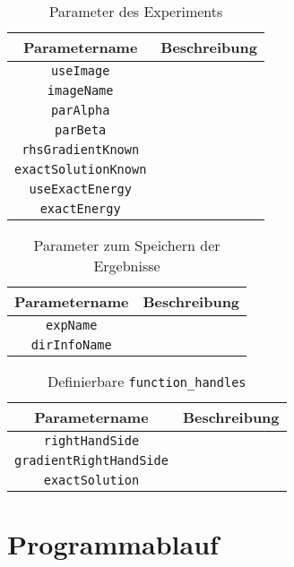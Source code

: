 \begin{table}
  \centering
  \begin{tabular}{c|p{9cm}}
    \hline
    Parametername  & Beschreibung\\  
    \hline
    \texttt{useImage} & \\
    \texttt{imageName} & \\
    \texttt{parAlpha}& \\
    \texttt{parBeta} & \\
    \texttt{rhsGradientKnown} & \\
    \texttt{exactSolutionKnown}& \\
    \texttt{useExactEnergy} & \\
    \texttt{exactEnergy} & \\
    \hline
  \end{tabular}
  \caption{Parameter des Experiments}
  \label{tab:paramsExperiment}
\end{table} 

\begin{table}
  \centering
  \begin{tabular}{c|p{9cm}}
    \hline
    Parametername  & Beschreibung\\  
    \hline
    \texttt{expName} & \\
    \texttt{dirInfoName} & \\
    \hline
  \end{tabular}
  \caption{Parameter zum Speichern der Ergebnisse}
  \label{tab:paramsDoc}
\end{table} 

\begin{table}
  \centering
  \begin{tabular}{c|p{9cm}}
    \hline
    Parametername  & Beschreibung\\  
    \hline
    \texttt{rightHandSide} & \\
    \texttt{gradientRightHandSide} & \\
    \texttt{exactSolution}& \\
    \hline
  \end{tabular}
  \caption{Definierbare \texttt{function\_handles}}
  \label{tab:paramsFunctions}
\end{table} 


\section{Programmablauf}
\label{sec:programFlow}

